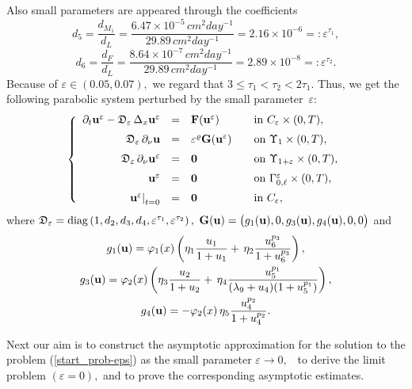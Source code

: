 \documentclass[reqno]{amsart}            %
\numberwithin{equation}{section}
\begin{document}
Also small parameters are appeared through the coefficients
$$
d_5 = \frac{d_{M_1}}{d_L} = \frac{6.47 \times 10^{-5} \, cm^2 day^{-1}}{29.89 \, cm^2 day^{-1}} = 2.16\times 10^{-6} =: \varepsilon^{\tau_1},
$$
$$
d_6 = \frac{d_{F}}{d_L} = \frac{8.64 \times 10^{-7} \, cm^2 day^{-1}}{29.89 \, cm^2 day^{-1}} = 2.89 \times 10^{-8}=: \varepsilon^{\tau_2}.
$$
Because of $\varepsilon\in (0.05 , 0.07),$ we regard that $3 \le \tau_1 < \tau_2 < 2 \tau_1.$
Thus, we get the following parabolic system perturbed by the small parameter~$\varepsilon:$
\begin{equation}\label{start_prob-eps}
\left\{
    \begin{array}{rcll}
    \partial_t {\bf u}^\varepsilon - \mathfrak{D}_\varepsilon \, \Delta_x {\bf u}^\varepsilon  &=& {\bf F}({\bf u}^\varepsilon)
                    &\quad \mbox{in} \ C_{{\varepsilon}}\times (0,T),
                    \\[2mm]
 \mathfrak{D}_\varepsilon \, \partial_{\nu} {\bf u} &=&    {\varepsilon^\varrho} {\bf G}({\bf u}^\varepsilon)
                    &\quad \mbox{on} \ \Upsilon_{1}\times (0,T),
                    \\[2mm]
 \mathfrak{D}_\varepsilon \,  \partial_{\nu} {\bf u}^\varepsilon &=&   {\bf 0}
                    &\quad \mbox{on} \ \Upsilon_{1+\varepsilon}\times (0,T),
                    \\[2mm]
  {\bf u}^\varepsilon &=& {\bf 0}& \quad \text{on} \  \Gamma^\varepsilon_{0, \ell}\times (0,T),
 \\[2mm]
    \left. {\bf u}^\varepsilon\right|_{t=0} &=&{\bf 0} &\quad \mbox{in} \   C_{{\varepsilon}},
   \end{array}\right.
\end{equation}
where  $\mathfrak{D}_\varepsilon = {\rm diag}\left(1, d_2, d_3, d_4, {\varepsilon^{\tau_1}}, {\varepsilon^{\tau_2}}\right),$
${\bf G}({\bf u})= \big(g_1({\bf u}), 0, g_3({\bf u}), g_4({\bf u}), 0, 0\big)$  and
\begin{gather}\label{g-1}
g_1({\bf u}) = \varphi_1(x) \left(
 \eta_1 \dfrac{u_1}{1 + u_1} + \, \eta_2 \dfrac{u_6^{p_3}}{1 + u_6^{p_3}}\right),
\\\label{g-2}
g_3({\bf u}) = \varphi_2(x) \left(  \eta_3
\dfrac{u_2}{1 + u_2} + \, \eta_4 \dfrac{u_5^{p_1}}{(\lambda_{9} + u_4)(1 + u_5^{p_1})}\right),
\\ \label{g-3}
g_4({\bf u}) =
- \varphi_2(x)\,  \eta_5 \dfrac{  u_4^{p_2}}{1 + u_4^{p_2}}.
\end{gather}


{\sf Next our aim is to
construct the asymptotic approximation for the solution to the problem  (\ref{start_prob-eps}) as the small parameter $\varepsilon \to 0,$
\ to derive the limit problem $(\varepsilon =0),$ and to prove the corresponding asymptotic estimates.}
\end{document}
